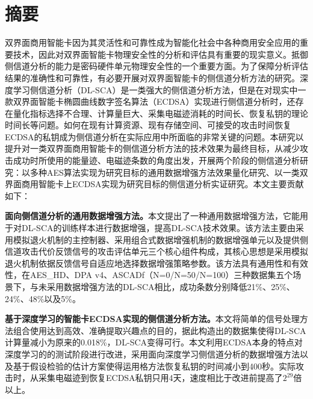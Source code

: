 
\maketitle%
\MAKETITLE%
\makedeclaration%
\intobmk\chapter*{摘\quad 要}%
\setcounter{page}{1}%

双界面商用智能卡因为其灵活性和可靠性成为智能化社会中各种商用安全应用的重要技术，因此对双界面智能卡物理安全性的分析和评估具有重要的现实意义。抵御侧信道分析的能力是密码硬件单元物理安全性的一个重要方面。为了保障分析评估结果的准确性和可靠性，有必要开展对双界面智能卡的侧信道分析方法的研究。深度学习侧信道分析（DL-SCA）是一类强大的侧信道分析方法，但是在对现实中一款双界面智能卡椭圆曲线数字签名算法（ECDSA）实现进行侧信道分析时，还存在量化指标选择不合理、计算量巨大、采集电磁迹消耗的时间长、恢复私钥的理论时间长等问题。如何在现有计算资源、现有存储空间、可接受的攻击时间恢复ECDSA的私钥成为侧信道分析在实际应用中所面临的非常关键的问题。本研究以提升对一类双界面商用智能卡的侧信道分析方法的技术效果为最终目标，从减少攻击成功时所使用的能量迹、电磁迹条数的角度出发，开展两个阶段的侧信道分析研究：以多种AES算法实现为研究目标的通用数据增强方法效果量化研究、以一类双界面商用智能卡上ECDSA实现为研究目标的侧信道分析实证研究。本文主要贡献如下：

\textbf{面向侧信道分析的通用数据增强方法。}本文提出了一种通用数据增强方法，它能用于对DL-SCA的训练样本进行数据增强，提高DL-SCA技术效果。该方法主要由采用模拟退火机制的主控制器、采用组合式数据增强机制的数据增强单元以及提供侧信道攻击代价反馈信号的攻击评估单元三个核心组件构成，其核心思想是采用模拟退火机制依据反馈信号自适应地选择数据增强策略参数。该方法具有通用性和有效性，在AES\_HD、DPA v4、ASCADf（N=0/N=50/N=100）三种数据集五个场景下，与未采用数据增强方法的DL-SCA相比，成功条数分别降低21\%、25\%、24\%、48\%以及5\%。

\textbf{基于深度学习的智能卡ECDSA实现的侧信道分析方法。}本文将简单的信号处理方法组合使用达到高效、准确提取兴趣点的目的，据此构造出的数据集使得DL-SCA计算量减小为原来的0.018\%，DL-SCA变得可行。本文利用ECDSA本身的特点对深度学习的的测试阶段进行改进，采用面向深度学习侧信道分析的数据增强方法以及基于假设检验的估计方案使得运用格方法恢复私钥的时间减小到400秒。实际攻击时，从采集电磁迹到恢复ECDSA私钥只用4天，速度相比于改进前提高了$2^{29}$倍以上。

